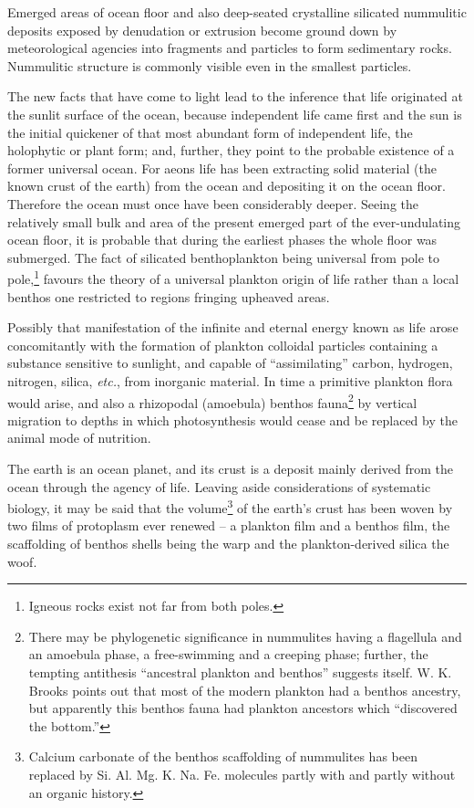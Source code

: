 \documentclass[a4paper, 12pt, oneside]{article}
\begin{document}
Emerged areas of ocean floor and also deep-seated crystalline silicated nummulitic deposits exposed by denudation or extrusion become ground down by meteorological agencies into fragments and particles to form sedimentary rocks. Nummulitic structure is commonly visible even in the smallest particles.

The new facts that have come to light lead to the inference that life originated at the sunlit surface of the ocean, because independent life came first and the sun is the initial quickener of that most abundant form of independent life, the holophytic or plant form; and, further, they point to the probable existence of a former universal ocean. For aeons life has been extracting solid material (the known crust of the earth) from the ocean and depositing it on the ocean floor. Therefore the ocean must once have been considerably deeper. Seeing the relatively small bulk and area of the present emerged part of the ever-undulating ocean floor, it is probable that during the earliest phases the whole floor was submerged. The fact of silicated benthoplankton being universal from pole to pole,\footnote{Igneous rocks exist not far from both poles.} favours the theory of a universal plankton origin of life rather than a local benthos one restricted to regions fringing upheaved areas.

Possibly that manifestation of the infinite and eternal energy known as life arose concomitantly with the formation of plankton colloidal particles containing a substance sensitive to sunlight, and capable of ``assimilating'' carbon, hydrogen, nitrogen, silica, \emph{etc.}, from inorganic material. In time a primitive plankton flora would arise, and also a rhizopodal (amoebula) benthos fauna\footnote{There may be phylogenetic significance in nummulites having a flagellula and an amoebula phase, a free-swimming and a creeping phase; further, the tempting antithesis ``ancestral plankton and benthos'' suggests itself. W. K. Brooks points out that most of the modern plankton had a benthos ancestry, but apparently this benthos fauna had plankton ancestors which ``discovered the bottom.''} by vertical migration to depths in which photosynthesis would cease and be replaced by the animal mode of nutrition.

The earth is an ocean planet, and its crust is a deposit mainly derived from the ocean through the agency of life. Leaving aside considerations of systematic biology, it may be said that the volume\footnote{Calcium carbonate of the benthos scaffolding of nummulites has been replaced by Si. Al. Mg. K. Na. Fe. molecules partly with and partly without an organic history.} of the earth's crust has been woven by two films of protoplasm ever renewed -- a plankton film and a benthos film, the scaffolding of benthos shells being the warp and the plankton-derived silica the woof.
\end{document}
